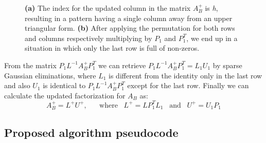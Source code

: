 \documentclass[journal,article,submit,electronics,pdftex]{Definitions/mdpi}
\begin{document}
{\begin{figure}[H]
\centering
{}
\caption{\textbf{(a)} The index for the updated column in the matrix $A_B^+$ is \emph{h}, resulting in a pattern having a single column away from an upper triangular form. \textbf{(b)} After applying the permutation for both rows and columns respectively multiplying by $P_1$ and $P_1^T$, we end up in a situation in which only the last row is full of non-zeros.}
\label{fig:update}
\end{figure}

From the matrix $P_1 L^{-1} A_B^+ P_1^T$ we can retrieve $P_1 L^{-1} A_B^+ P_1^T = L_1 U_1$ by sparse Gaussian eliminations, where $L_1$ is different from the identity only in the last row and also $U_1$ is identical to $P_1 L^{-1} A_B^+ P_1^T$ except for the last row. Finally we can calculate the updated factorization for $A_B$ as:
\begin{equation}
    A_B^+ = L^+ U^+, \hspace{20pt} \text{where} \hspace{10pt} L^+ = LP_1^TL_1 \hspace{10pt} \text{and}  \hspace{10pt} U^+ = U_1P_1
\end{equation}

\subsection{Proposed algorithm pseudocode}

\begin{algorithm}[h]
\DontPrintSemicolon
  

\end{algorithm}}
\end{document}
